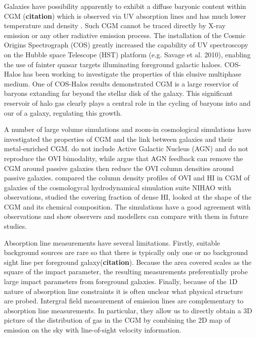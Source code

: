 \documentclass[useAMS,usenatbib]{mn2e}
\def \ion#1#2{#1{\footnotesize{#2}}\relax}
\def \hi       {\ion{H}{I}}
\def \ovi      {\ion{O}{VI}}
\begin{document}
Galaxies have possibility apparently to exhibit a diffuse baryonic
content within CGM ({\bf citation}) which is observed via UV absorption
lines and has much lower temperature and density \citep{Werk13}.
Such CGM cannot be traced directly by X-ray emission or any other
radiative emission process.
The installation of the Cosmic Origins Spectrograph (COS) greatly
increased the capability of UV spectroscopy on the Hubble space
Telescope (HST) platform (e.g. Savage et al. 2010), enabling the
use of fainter quasar targets illuminating foreground galactic
haloes.
COS-Halos \citep{Tumlinson11, Thom12, Werk12, Werk13} has been 
working to investigate 
the properties of this elusive multiphase medium.
One of COS-Halos results demonstrated CGM is a large reservior
of baryons extanding far beyond the stellar disk of the galaxy.
This significant reservoir of halo gas clearly plays a central 
role in the cycling of baryons into and our of a galaxy, 
regulating this growth. 

A number of large volume simulations \citep{Ford13, Ford15, Suresh15, Oppenheimer16} and 
zoom-in cosmological simulations \citep{Stinson12,Hummels13,Shull14} have 
investigated the properties of CGM and the link between 
galaxies and their metal-enriched CGM.
\citet{Ford15} do not include Active Galactic Nucleus (AGN) and do not
reproduce the \ovi{} bimodality, while \citet{Suresh15b} argue that
AGN feedback can remove the CGM around passive galaxies then reduce
the \ovi{} column densities around  passive galaxies.
\citet{Gutcke16} compared the column density profiles of \ovi{} and \hi{}
in CGM of galaxies of the cosmologycal hydrodynamical simulation suite 
NIHAO \citep{Wang15} with observations, studied the covering fraction of 
dense \hi{}, looked at the shape of the CGM and its chemical composition.
The simulations have a good agreement with observations and show observers
and modellers can compare with them in future studies. 

Absorption line measurements have several limitations. 
Firstly, suitable background sources are rare so that there is 
typically only one or no background sight line per foreground
galaxy({\bf citation}). Because the area covered scales as the 
square of the impact parameter, the resulting measurements 
preferentially probe large impact parameters from foreground 
galaxies.
Finally, because of the 1D nature of absorption line constraints
it is often unclear what physical structure are probed.
Intergral field measurement of emission lines are complementary 
to absorption line measurements.
In particular, they allow us to directly obtain a 3D picture
of the distribution of gas in the CGM by combining the 2D map of
emission on the sky with line-of-sight velocity information.
\end{document}
